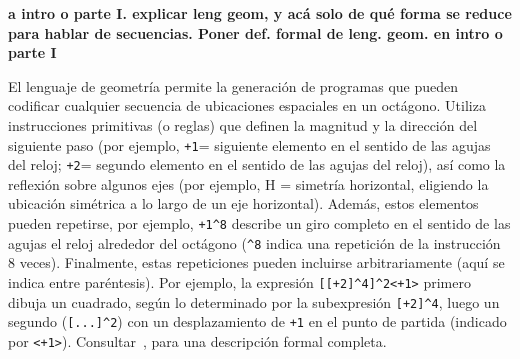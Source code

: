
\color{blue}
{\bf a intro o parte I. explicar leng geom, y acá solo de qué forma se reduce para hablar de secuencias. Poner def. formal de leng. geom. en intro o parte I}

El lenguaje de geometría permite la generación de programas que pueden codificar cualquier secuencia de ubicaciones espaciales en un octágono. Utiliza instrucciones primitivas (o reglas) que definen la magnitud y la dirección del siguiente paso (por ejemplo, \verb#+1#= siguiente elemento en el sentido de las agujas del reloj; \verb#+2#= segundo elemento en el sentido de las agujas del reloj), así como la reflexión sobre algunos ejes (por ejemplo, H = simetría horizontal, eligiendo la ubicación simétrica a lo largo de un eje horizontal). Además, estos elementos pueden repetirse, por ejemplo, \verb#+1^8# describe un giro completo en el sentido de las agujas el reloj alrededor del octágono (\verb#^8# indica una repetición de la instrucción 8 veces). Finalmente, estas repeticiones pueden incluirse arbitrariamente (aquí se indica entre paréntesis). Por ejemplo, la expresión \verb#[[+2]^4]^2<+1># primero dibuja un cuadrado, según lo determinado por la subexpresión \verb#[+2]^4#, luego un segundo (\verb#[...]^2#) con un desplazamiento de \verb#+1# en el punto de partida (indicado por \verb#<+1>#). Consultar~\cite{amalric2017language}, para una descripción formal completa. 

